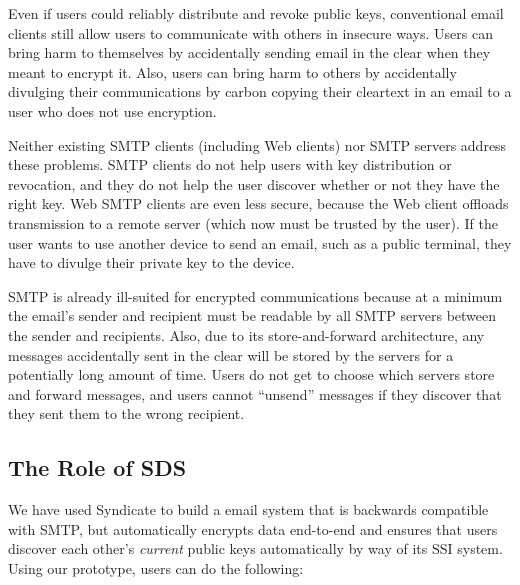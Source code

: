 Even if users could reliably distribute and revoke public keys, conventional
email clients still allow users to communicate with others in insecure ways.
Users can bring harm to themselves by accidentally sending email in the clear
when they meant to encrypt it.  Also, users can bring harm to others
by accidentally divulging their communications by carbon copying
their cleartext in an email to a user who does not use encryption.

Neither existing SMTP clients (including Web clients) nor
SMTP servers address these problems.  SMTP clients do not help users with key
distribution or revocation, and they do not help the user discover whether or
not they have the right key.  Web SMTP clients are even less secure, because the
Web client offloads transmission to a remote server (which now must be trusted
by the user).  If the user wants to use another device to send an email, such as
a public terminal, they have to divulge their private key to the device.

SMTP is already ill-suited for encrypted communications because at a minimum the email's
sender and recipient must be readable by all SMTP servers between the sender and
recipients.  Also, due to its store-and-forward architecture, any messages
accidentally sent in the clear will be stored by the servers for a potentially
long amount of time.  Users do not get to choose which servers store and forward
messages, and users cannot ``unsend'' messages if they discover that they sent
them to the wrong recipient.

\subsection{The Role of SDS}

We have used Syndicate to build a email system that is backwards compatible
with SMTP, but automatically encrypts data end-to-end and ensures that users
discover each other's \emph{current} public keys automatically by way of its SSI
system.  Using our prototype, users can do the following:

